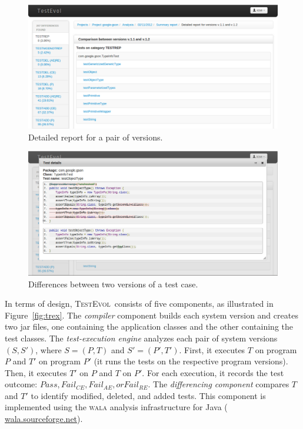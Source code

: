 \documentclass[conference]{IEEEtran}
\newcommand{\mt}{\mathit}
\newcommand{\pass}{\mt{Pass}}
\newcommand{\failce}{\mt{Fail}_{CE}}
\newcommand{\failre}{\mt{Fail}_{RE}}
\newcommand{\failae}{\mt{Fail}_{AE}}
\newcommand{\tool}{\textsc{TestEvol}\xspace}
\begin{document}
\begin{figure}[t]
	\centering
	\includegraphics[width=\columnwidth]{2-versiondetails}
        \vspace*{-20pt}
	\caption{Detailed report for a pair of versions.}
        \vspace*{-8pt}
	\label{fig:versiondetails}
\end{figure}

\begin{figure}[t]
	\centering
	\includegraphics[width=\columnwidth]{3-testdetails}
        \vspace*{-20pt}
	\caption{Differences between two versions of a test case.}
        \vspace*{-8pt}
	\label{fig:testdetails}
\end{figure}

In terms of design, \tool\ consists of five components, as illustrated
in Figure~\ref{fig:trex}.
%
The \emph{compiler} component builds each system version and creates
two jar files, one containing the application classes and the other
containing the test classes.
%
The \emph{test-execution engine} analyzes each pair of system versions
$(S, S')$, where $S = (P, T)$ and $S' = (P', T')$.  First, it executes
$T$ on program $P$ and $T'$ on program $P'$ (\ie it runs the tests on
the respective program versions).  Then, it executes $T'$ on $P$ and
$T$ on $P'$. For each execution, it records the test outcome: $\pass,
\failce, \failae, or \failre$.
%
The \emph{differencing component} compares $T$ and $T'$ to identify
modified, deleted, and added tests. This component is implemented
using the \textsc{wala} analysis infrastructure for Java ({\small
  \url{wala.sourceforge.net}}).
\end{document}
